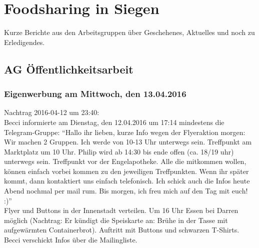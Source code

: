 \documentclass{scrreprt}
\begin{document}
\chapter{Foodsharing in Siegen}
Kurze Berichte aus den Arbeitsgruppen über Geschehenes, Aktuelles und noch zu Erledigendes.
\section{AG Öffentlichkeitsarbeit}

\subsection{Eigenwerbung am Mittwoch, den 13.04.2016}
Nachtrag 2016-04-12 um 23:40: \\
Becci informierte am Dienstag, den 12.04.2016 um 17:14 mindestens die Telegram-Gruppe: \enquote{Hallo ihr lieben, kurze Info wegen der Flyeraktion morgen:\\
Wir machen 2 Gruppen. Ich werde von 10-13 Uhr unterwegs sein. Treffpunkt am Marktplatz um 10 Uhr. Philip wird ab 14:30 bis ende offen (ca. 18/19 uhr) unterwegs sein. Treffpunkt vor der Engelapotheke. Alle die mitkommen wollen, können einfach vorbei kommen zu den jeweiligen Treffpunkten. Wenn ihr später kommt, dann kontaktiert uns einfach telefonisch. Ich schick auch die Infos heute Abend nochmal per mail rum. Bis morgen, ich freu mich auf den Tag mit euch!  :)}\\
Flyer und Buttons in der Innenstadt verteilen. Um 16 Uhr Essen bei Darren möglich (Nachtrag: Er kündigt die Speiskarte an: Brühe in der Tasse mit aufgewärmten Containerbrot). Auftritt mit Buttons und schwarzen T-Shirts. Becci verschickt Infos über die Mailingliste.
\end{document}
